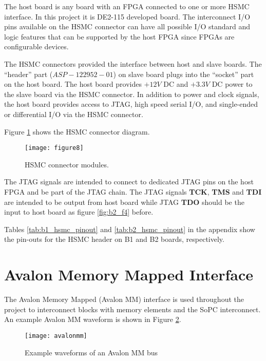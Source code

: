 The host board is any board with an FPGA connected to one or more HSMC interface. In this project it is DE2-115 developed board.
The interconnect I/O pins available on the HSMC connector can have all possible I/O standard and
logic features that can be supported by the host FPGA since FPGAs are configurable devices.

The HSMC connectors provided the interface between host and slave boards. The ``header''
part ($ASP-122952-01$) on slave board plugs into the ``socket'' part on the host board. The host
board provides $+12V$ DC and $+3.3V$ DC power to the slave board via the HSMC connector.
In addition to power and clock signals, the host board provides access to JTAG,
high speed serial I/O, and single-ended or differential I/O via the HSMC connector.

Figure \ref{fig:b2_f8} shows the HSMC connector diagram.

\begin{figure}
 \centering
 \texttt{[image: figure8]}
 \caption{HSMC connector modules.}
 \label{fig:b2_f8}
\end{figure}

The JTAG signals are intended to connect to dedicated JTAG pins on the host FPGA and
be part of the JTAG chain. The JTAG signals \textbf{TCK}, \textbf{TMS} and \textbf{TDI} are intended to be
output from host board while JTAG \textbf{TDO} should be the input to host board as figure \ref{fig:b2_f4} before.

Tables \ref{tab:b1_hsmc_pinout} and \ref{tab:b2_hsmc_pinout} in the appendix show the pin-outs for the HSMC header on B1 and B2 boards, respectively.












\newpage
\section{Avalon Memory Mapped Interface}
The Avalon Memory Mapped (Avalon MM) interface is used throughout the project to interconnect
blocks with memory elements and the SoPC interconnect. An example Avalon MM waveform
is shown in Figure \ref{figure:avalonmm}.
\begin{figure}[h!]
\begin{center}
\texttt{[image: avalonmm]}
\caption{Example waveforms of an Avalon MM bus}
\label{figure:avalonmm}
\end{center}
\end{figure}


